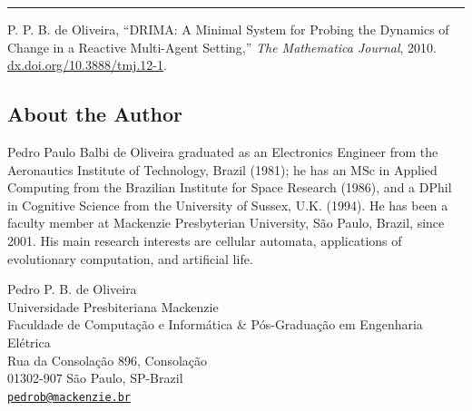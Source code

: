 \documentclass[11pt, a4paper]{article}
\begin{document}
\bigskip
\noindent
\rule{\textwidth}{0.4pt}
\medskip

\noindent
\small P. P. B. de Oliveira, ``DRIMA: A Minimal System for Probing the Dynamics of Change in a Reactive Multi-Agent Setting,'' \textit{The Mathematica Journal}, 2010. \href{https://doi.org/10.3888/tmj.12-1}{dx.doi.org/10.3888/tmj.12-1}.

\subsection*{About the Author}

\noindent
Pedro Paulo Balbi de Oliveira graduated as an Electronics Engineer from the Aeronautics Institute of Technology, Brazil (1981); he has an MSc in Applied Computing from the Brazilian Institute for Space Research (1986), and a DPhil in Cognitive Science from the University of Sussex, U.K. (1994). He has been a faculty member at Mackenzie Presbyterian University, S\~ao Paulo, Brazil, since 2001. His main research interests are cellular automata, applications of evolutionary computation, and artificial life.

\vspace{1em}
\noindent
Pedro P. B. de Oliveira\\
Universidade Presbiteriana Mackenzie\\
Faculdade de Computa\c{c}\~ao e Inform\'atica \& P\'os-Gradua\c{c}\~ao em Engenharia El\'etrica\\
Rua da Consola\c{c}\~ao 896, Consola\c{c}\~ao\\
01302-907 S\~ao Paulo, SP-Brazil\\
\href{mailto:pedrob@mackenzie.br}{\texttt{pedrob@mackenzie.br}}
\end{document}
